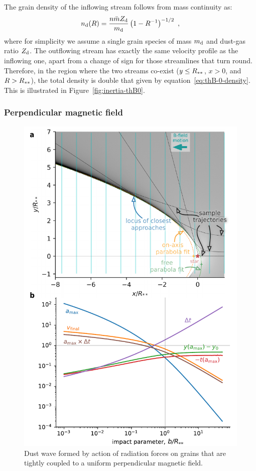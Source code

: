 The grain density of the inflowing stream follows from mass continuity as:
\begin{equation}
  \label{eq:thB-0-density}
  n_{\text{d}}(R) = \frac{n \bar{m} Z_{\text{d}}}{m_{\text{d}}} \left( 1 - R^{-1} \right)^{-1/2} \ ,
\end{equation}
where for simplicity we assume a single grain species of mass
\(m_{\text{d}}\) and dust-gas ratio \(Z_{\text{d}}\). The outflowing stream has
exactly the same velocity profile as the inflowing one, apart from a
change of sign for those streamlines that turn round.  Therefore, in
the region where the two streams co-exist (\(y \le R_{**}\),
\(x > 0\), and \(R > R_{**}\)), the total density is double that
given by equation~\eqref{eq:thB-0-density}.  This is illustrated in
Figure~\ref{fig:inertia-thB0}.

\subsubsection{Perpendicular magnetic field}
\label{sec:perp-magn-field}


\begin{figure}
  \centering
  \includegraphics[width=\linewidth]{figs/perp-bfield-dust-wave-inertia}
  \caption{Dust wave formed by action of radiation forces on grains
    that are tightly coupled to a uniform perpendicular magnetic
    field.}
  \label{fig:inertia-thB90}
\end{figure}


